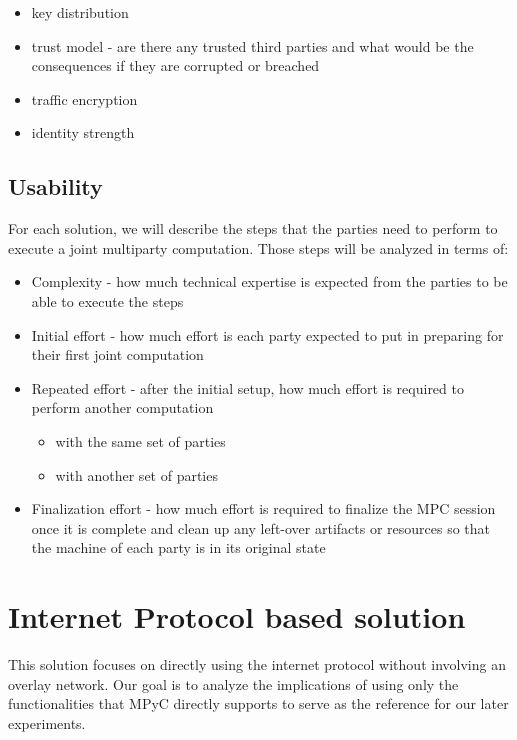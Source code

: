 \begin{itemize}
\tightlist
\item
  key distribution
\item
  trust model - are there any trusted third parties and what would be the consequences if they are corrupted or breached
\item
  traffic encryption
\item
  identity strength
\end{itemize}

\section{Usability}\label{thesis__030-methods.md__usability}

For each solution, we will describe the steps that the parties need to perform to execute a joint multiparty computation. Those steps will be analyzed in terms of:

\begin{itemize}
\tightlist
\item
  Complexity - how much technical expertise is expected from the parties to be able to execute the steps
\item
  Initial effort - how much effort is each party expected to put in preparing for their first joint computation
\item
  Repeated effort - after the initial setup, how much effort is required to perform another computation

  \begin{itemize}
  \tightlist
  \item
    with the same set of parties
  \item
    with another set of parties
  \end{itemize}
\item
  Finalization effort - how much effort is required to finalize the MPC session once it is complete and clean up any left-over artifacts or resources so that the machine of each party is in its original state
\end{itemize}

\label{thesis__050-internet-protocol.md}
\chapter{Internet Protocol based solution}\label{thesis__050-internet-protocol.md__internet-protocol-based-solution}

This solution focuses on directly using the internet protocol without involving an overlay network. Our goal is to analyze the implications of using only the functionalities that MPyC directly supports to serve as the reference for our later experiments.

